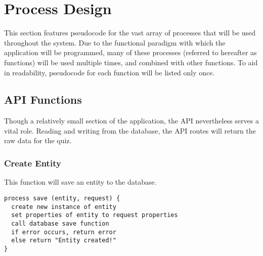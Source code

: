 \section{Process Design}
This section features pseudocode for the vast array of processes that will be used throughout the system. Due to the functional paradigm with which the application will be programmed, many of these processes (referred to hereafter as functions) will be used multiple times, and combined with other functions. To aid in readability, pseudocode for each function will be listed only once.

\subsection{API Functions}
Though a relatively small section of the application, the API nevertheless serves a vital role. Reading and writing from the database, the API routes will return the raw data for the quiz.

\subsubsection{Create Entity}
This function will save an entity to the database.
\begin{verbatim}
process save (entity, request) {
  create new instance of entity
  set properties of entity to request properties
  call database save function
  if error occurs, return error
  else return "Entity created!"
}
\end{verbatim}

